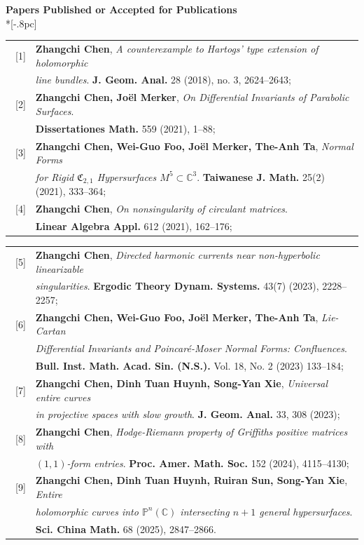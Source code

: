 \documentclass[12pt]{article}
\begin{document}
{\large \bf Papers Published or Accepted for Publications} \\*[-.8pc]
\underline{\hspace{6.6in}} 
\begin{tabular}{ll}
~[1] & {\bf Zhangchi Chen}, {\em A counterexample to Hartogs' type extension of holomorphic}\\
& {\em line bundles}. {\bf J. Geom. Anal.} 28 (2018), no. 3, 2624--2643;\\

~[2] & {\bf Zhangchi Chen, Joël Merker}, {\em On Differential Invariants of Parabolic Surfaces}.\\
& {\bf Dissertationes Math.}  559 (2021), 1--88;\\

~[3] & {\bf Zhangchi Chen, Wei-Guo Foo, Joël Merker, The-Anh Ta}, {\em Normal Forms}\\
& {\em for Rigid $\mathfrak{C}_{2,1}$ Hypersurfaces $M^5\subset \mathbb{C}^3$}. {\bf Taiwanese J. Math.}  25(2) (2021), 333--364;\\

~[4] & {\bf Zhangchi Chen}, {\em On nonsingularity of circulant matrices}.\\
& {\bf Linear Algebra Appl.} 612 (2021), 162--176;\\
\end{tabular}
\begin{tabular}{ll}

~[5] & {\bf Zhangchi Chen}, {\em Directed harmonic currents near non-hyperbolic linearizable}\\
& {\em singularities}. {\bf Ergodic Theory Dynam. Systems.} 43(7) (2023),  2228--2257;\\

~[6] & {\bf Zhangchi Chen, Wei-Guo Foo, Jo\"el Merker, The-Anh Ta}, {\em Lie-Cartan}\\
& {\em Differential Invariants and Poincar\'e-Moser Normal Forms: Confluences}.\\
& {\bf Bull. Inst. Math. Acad. Sin. (N.S.).} Vol. 18, No. 2 (2023) 133--184;\\

~[7] & {\bf Zhangchi Chen, Dinh Tuan Huynh, Song-Yan Xie}, {\em Universal entire curves}\\
& {\em in projective spaces with slow growth}. {\bf J. Geom. Anal.} 33, 308 (2023);\\

~[8] & {\bf Zhangchi Chen}, {\em Hodge-Riemann property of Griffiths positive matrices with}\\
& {\em $(1,1)$-form entries}. {\bf Proc. Amer. Math. Soc.} 152 (2024), 4115--4130;\\

~[9] & {\bf Zhangchi Chen, Dinh Tuan Huynh, Ruiran Sun, Song-Yan Xie}, {\em Entire}\\
& {\em holomorphic curves into $\mathbb{P}^n(\mathbb{C})$ intersecting $n+1$ general hypersurfaces}. \\
& {\bf Sci. China Math.} 68 (2025), 2847--2866.
\end{tabular}
\end{document}
